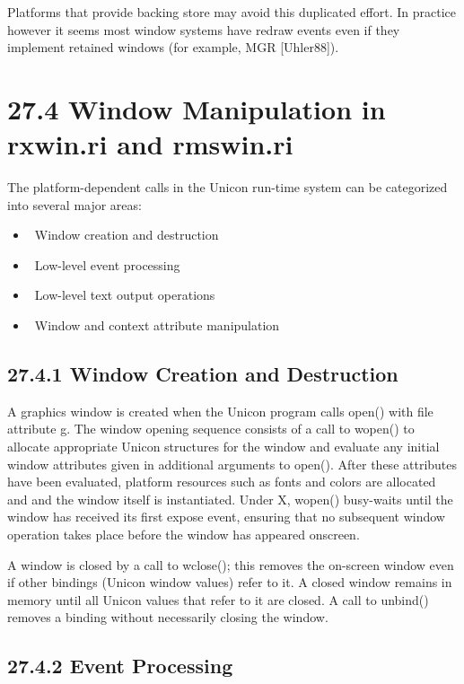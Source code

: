 Platforms that provide backing store may avoid this duplicated
effort. In practice however it seems most window systems have redraw
events even if they implement retained windows (for example, MGR
[Uhler88]).

\section[27.4 Window Manipulation in rxwin.ri and rmswin.ri]{27.4 Window Manipulation in rxwin.ri and rmswin.ri}

The platform-dependent calls in the Unicon run-time system can be
categorized into several major areas:

\liststyleLxlv
\begin{itemize}
\item 
\ Window creation and destruction
\item 
\ Low-level event processing
\item 
\ Low-level text output operations
\item 
\ Window and context attribute manipulation
\end{itemize}

\subsection[27.4.1 Window Creation and Destruction]{27.4.1 Window Creation and Destruction}

A graphics window is created when the Unicon program calls
\textsf{open()} with file attribute
\textsf{{\textquotedbl}g{\textquotedbl}}. The window opening sequence
consists of a call to \textsf{wopen()} to allocate appropriate Unicon
structures for the window and evaluate any initial window attributes
given in additional arguments to \textsf{open()}. After these
attributes have been evaluated, platform resources such as fonts and
colors are allocated and and the window itself is instantiated. Under
X, \textsf{wopen()} busy-waits until the window has received its first
expose event, ensuring that no subsequent window operation takes place
before the window has appeared onscreen.

A window is closed by a call to \textsf{wclose()}; this removes the
on-screen window even if other bindings (Unicon window values) refer
to it. A closed window remains in memory until all Unicon values that
refer to it are closed. A call to \textsf{unbind()} removes a binding
without necessarily closing the window.

\subsection[27.4.2 Event Processing]{27.4.2 Event Processing}

